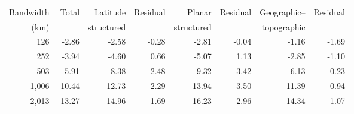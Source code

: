 \begin{tabular}{rrrrrrrr}
\toprule
Bandwidth & Total & Latitude & Residual & Planar & Residual & Geographic-- & Residual \\
(km) & & structured & & structured & & topographic & \\
\midrule
126 & -2.86 & -2.58 & -0.28 & -2.81 & -0.04 & -1.16 & -1.69 \\
252 & -3.94 & -4.60 & 0.66 & -5.07 & 1.13 & -2.85 & -1.10 \\
503 & -5.91 & -8.38 & 2.48 & -9.32 & 3.42 & -6.13 & 0.23 \\
1,006 & -10.44 & -12.73 & 2.29 & -13.94 & 3.50 & -11.39 & 0.94 \\
2,013 & -13.27 & -14.96 & 1.69 & -16.23 & 2.96 & -14.34 & 1.07 \\
\bottomrule
\end{tabular}
